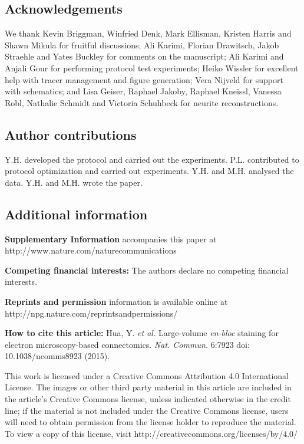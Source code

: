 \documentclass{article}
\begin{document}
\subsection*{Acknowledgements}
We thank Kevin Briggman, Winfried Denk, Mark Ellisman, Kristen Harris and Shawn Mikula for fruitful discussions; Ali Karimi, Florian Drawitsch, Jakob Straehle and Yates Buckley for comments on the manuscript; Ali Karimi and Anjali Gour for performing protocol test experiments; Heiko Wissler for excellent help with tracer management and figure generation; Vera Nijveld for support with schematics; and Lisa Geiser, Raphael Jakoby, Raphael Kneissl, Vanessa Robl, Nathalie Schmidt and Victoria Schuhbeck for neurite reconstructions.

\subsection*{Author contributions}
Y.H. developed the protocol and carried out the experiments. P.L. contributed to protocol optimization and carried out experiments. Y.H. and M.H. analysed the data. Y.H. and M.H. wrote the paper.

\subsection*{Additional information}
\textbf{Supplementary Information} accompanies this paper at http://www.nature.com/naturecommunications

\noindent\textbf{Competing financial interests:} The authors declare no competing financial interests.

\noindent\textbf{Reprints and permission} information is available online at http://npg.nature.com/reprintsandpermissions/

\noindent\textbf{How to cite this article:} Hua, Y. \emph{et al.} Large-volume \emph{en-bloc} staining for electron microscopy-based connectomics. \emph{Nat. Commun.} 6:7923 doi: 10.1038/ncomms8923 (2015).

\medskip
\noindent This work is licensed under a Creative Commons Attribution 4.0 International License. The images or other third party material in this article are included in the article's Creative Commons license, unless indicated otherwise in the credit line; if the material is not included under the Creative Commons license, users will need to obtain permission from the license holder to reproduce the material. To view a copy of this license, visit http://creativecommons.org/licenses/by/4.0/
\end{document}
